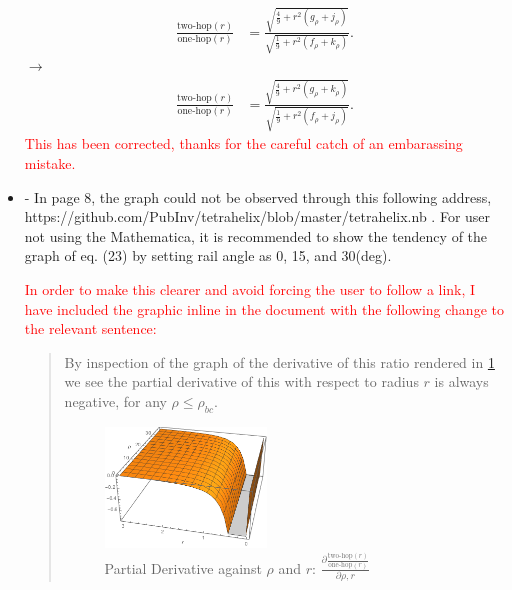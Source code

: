 \documentclass{article}
\newcommand{\highlighttext}[1] {\textcolor{red}{#1}}
\begin{document}
\begin{itemize}
\begin{equation}
  \begin{split}
  \frac{\text{two-hop}(r)}{ \text{one-hop}(r)}  &=
  \frac{\sqrt{\frac{4}{9}  + r^2(g_{\rho}+ j_{\rho})}}
       {\sqrt{\frac{1}{9} +r^2(f_{\rho}+k_{\rho}) }} \text{.}
  \end{split}       
\end{equation}
$\rightarrow$ 
\begin{equation}
  \begin{split}
  \frac{\text{two-hop}(r)}{ \text{one-hop}(r)}  &=
  \frac{\sqrt{\frac{4}{9}  + r^2(g_{\rho}+ k_{\rho})}}
       {\sqrt{\frac{1}{9} +r^2(f_{\rho}+j_{\rho}) }} \text{.}
  \end{split}       
\end{equation}
\highlighttext{This has been corrected, thanks for the careful catch of an embarassing mistake.}

\item 
- In page 8, the graph could not be observed through this following address,
https://github.com/PubInv/tetrahelix/blob/master/tetrahelix.nb . For user not using the
Mathematica, it is recommended to show the tendency of the graph of eq. (23) by setting
rail angle as 0, 15, and 30(deg).

\highlighttext{
  In order to make this clearer and avoid forcing the user to follow a link, I have included the graphic
  inline in the document with the following change to the relevant sentence:}

\begin{quote}

By inspection of the graph of the derivative of this ratio rendered in \cref{fig:partialderivativediagram} we see the partial derivative of this with respect to
radius $r$ is always negative, for any $\rho \leq \rho_{bc}$.

\begin{figure}
     \centering
     \includegraphics[width=0.45\textwidth]{figures/PartialDerivativeDiagram.png}
     \caption{Partial Derivative against $\rho$ and $r$: $ \frac{\partial \frac{\text{two-hop}(r)}{ \text{one-hop}(r)}}{\partial \rho, r} $ }
  \label{fig:partialderivativediagram}
\end{figure}
\end{quote}




\end{itemize}
\end{document}
